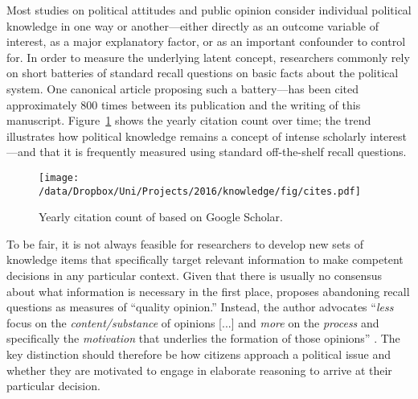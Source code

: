 
Most studies on political attitudes and public opinion consider individual political knowledge in one way or another---either directly as an outcome variable of interest, as a major explanatory factor, or as an important confounder to control for. In order to measure the underlying latent concept, researchers commonly rely on short batteries of standard recall questions on basic facts about the political system. One canonical article proposing such a battery--\citet{carpini1993measuring}--has been cited approximately 800 times between its publication and the writing of this manuscript. Figure~\ref{fig:carpini} shows the yearly citation count over time; the trend illustrates how political knowledge remains a concept of intense scholarly interest---and that it is frequently measured using standard off-the-shelf recall questions.

\begin{figure}[h]\centering
	\texttt{[image: /data/Dropbox/Uni/Projects/2016/knowledge/fig/cites.pdf]}
	\caption[Yearly citation count of \citet{carpini1993measuring}]{Yearly citation count of \citet{carpini1993measuring} based on Google Scholar.}\label{fig:carpini}
\end{figure}

To be fair, it is not always feasible for researchers to develop new sets of knowledge items that specifically target relevant information to make competent decisions in any particular context. Given that there is usually no consensus about what information is necessary in the first place, \citet{druckman2014pathologies} proposes abandoning recall questions as measures of ``quality opinion.'' Instead, the author advocates ``\textit{less} focus on the \textit{content/substance} of opinions [...] and \textit{more} on the \textit{process} and specifically the \textit{motivation} that underlies the formation of those opinions'' \citeyearpar[478, emphasis in the original]{druckman2014pathologies}. The key distinction should therefore be how citizens approach a political issue and whether they are motivated to engage in elaborate reasoning to arrive at their particular decision.

